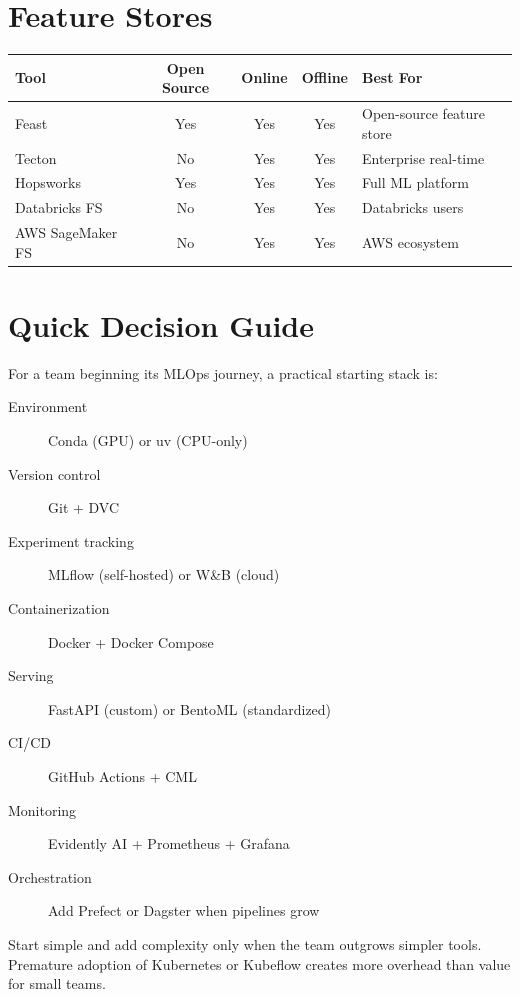 \section{Feature Stores}
\label{app:feature-tools}

\begin{center}
\begin{tabular}{@{}lcccl@{}}
\toprule
\textbf{Tool} & \textbf{Open Source} & \textbf{Online} &
  \textbf{Offline} & \textbf{Best For} \\
\midrule
Feast & Yes & Yes & Yes & Open-source feature store \\
Tecton & No & Yes & Yes & Enterprise real-time \\
Hopsworks & Yes & Yes & Yes & Full ML platform \\
Databricks FS & No & Yes & Yes & Databricks users \\
AWS SageMaker FS & No & Yes & Yes & AWS ecosystem \\
\bottomrule
\end{tabular}
\end{center}

\section{Quick Decision Guide}
\label{app:decision-guide}

\begin{bestpractice}[title=\textbf{Recommended starter stack}]
For a team beginning its MLOps journey, a practical starting stack is:
\begin{description}
  \item[Environment] Conda (GPU) or uv (CPU-only)
  \item[Version control] Git + DVC
  \item[Experiment tracking] MLflow (self-hosted) or W\&B (cloud)
  \item[Containerization] Docker + Docker Compose
  \item[Serving] FastAPI (custom) or BentoML (standardized)
  \item[CI/CD] GitHub Actions + CML
  \item[Monitoring] Evidently AI + Prometheus + Grafana
  \item[Orchestration] Add Prefect or Dagster when pipelines grow
\end{description}
Start simple and add complexity only when the team outgrows simpler
tools. Premature adoption of Kubernetes or Kubeflow creates more
overhead than value for small teams.
\end{bestpractice}
